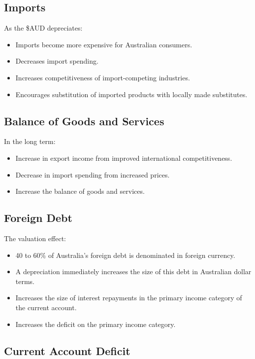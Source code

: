 \documentclass[a4paper,11pt]{article}
\begin{document}
\subsection{Imports}

As the \$AUD depreciates:

\begin{itemize}
\item Imports become more expensive for Australian consumers.
\item Decreases import spending.
\item Increases competitiveness of import-competing industries.
\item Encourages substitution of imported products with locally made
	substitutes.
\end{itemize}


\subsection{Balance of Goods and Services}

In the long term:

\begin{itemize}
\item Increase in export income from improved international competitiveness.
\item Decrease in import spending from increased prices.
\item Increase the balance of goods and services.
\end{itemize}


\subsection{Foreign Debt}

The valuation effect:

\begin{itemize}
\item 40 to 60\% of Australia's foreign debt is denominated in foreign currency.
\item A depreciation immediately increases the size of this debt in Australian
	dollar terms.
\item Increases the size of interest repayments in the primary income category
	of the current account.
\item Increases the deficit on the primary income category.
\end{itemize}


\subsection{Current Account Deficit}
\end{document}

